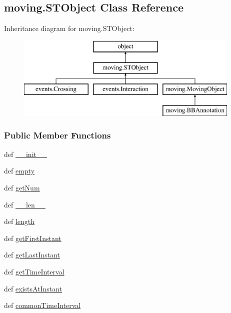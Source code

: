 \hypertarget{classmoving_1_1STObject}{\subsection{moving.\-S\-T\-Object Class Reference}
\label{classmoving_1_1STObject}
}
Inheritance diagram for moving.\-S\-T\-Object\-:\begin{figure}[H]
\begin{center}
\leavevmode
\includegraphics[height=4.000000cm]{classmoving_1_1STObject}
\end{center}
\end{figure}
\subsubsection*{Public Member Functions}
\begin{DoxyCompactItemize}
\item 
def \hyperlink{classmoving_1_1STObject_a3d567fa2525cdd67c83a63f4c75fc6b8}{\-\_\-\-\_\-init\-\_\-\-\_\-}
\item 
def \hyperlink{classmoving_1_1STObject_a6db67126552deecbd9f29620740bf987}{empty}
\item 
def \hyperlink{classmoving_1_1STObject_adffffbb60ff964e9630bf21aacf27e36}{get\-Num}
\item 
def \hyperlink{classmoving_1_1STObject_acd4b00ab285289be02ebcbcbf06868f7}{\-\_\-\-\_\-len\-\_\-\-\_\-}
\item 
def \hyperlink{classmoving_1_1STObject_a8f7da90a1bd34661702f50d0b3fc18e4}{length}
\item 
def \hyperlink{classmoving_1_1STObject_adae5762e2042f810b94ae64c44017a9c}{get\-First\-Instant}
\item 
def \hyperlink{classmoving_1_1STObject_a9de7ced8de2d7ced1cce171e230242fb}{get\-Last\-Instant}
\item 
def \hyperlink{classmoving_1_1STObject_acb69d600aef8ef1ae6ecaae3e06f9072}{get\-Time\-Interval}
\item 
def \hyperlink{classmoving_1_1STObject_ac9e2ddd8bc37448c968e0230fe29660c}{exists\-At\-Instant}
\item 
def \hyperlink{classmoving_1_1STObject_ae47064aafcb665f44a16ad0e623dce33}{common\-Time\-Interval}
\end{DoxyCompactItemize}
